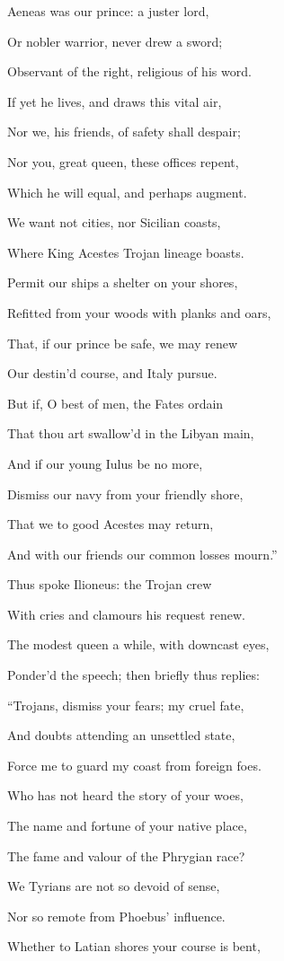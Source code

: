 Aeneas was our prince: a juster lord,

Or nobler warrior, never drew a sword;

Observant of the right, religious of his word.

If yet he lives, and draws this vital air,

Nor we, his friends, of safety shall despair;

Nor you, great queen, these offices repent,

Which he will equal, and perhaps augment.

We want not cities, nor Sicilian coasts,

Where King Acestes Trojan lineage boasts.

Permit our ships a shelter on your shores,

Refitted from your woods with planks and oars,

That, if our prince be safe, we may renew

Our destin’d course, and Italy pursue.

But if, O best of men, the Fates ordain

That thou art swallow’d in the Libyan main,

And if our young Iulus be no more,

Dismiss our navy from your friendly shore,

That we to good Acestes may return,

And with our friends our common losses mourn.”

Thus spoke Ilioneus: the Trojan crew

With cries and clamours his request renew.

The modest queen a while, with downcast eyes,

Ponder’d the speech; then briefly thus replies:

“Trojans, dismiss your fears; my cruel fate,

And doubts attending an unsettled state,

Force me to guard my coast from foreign foes.

Who has not heard the story of your woes,

The name and fortune of your native place,

The fame and valour of the Phrygian race?

We Tyrians are not so devoid of sense,

Nor so remote from Phoebus’ influence.

Whether to Latian shores your course is bent,

